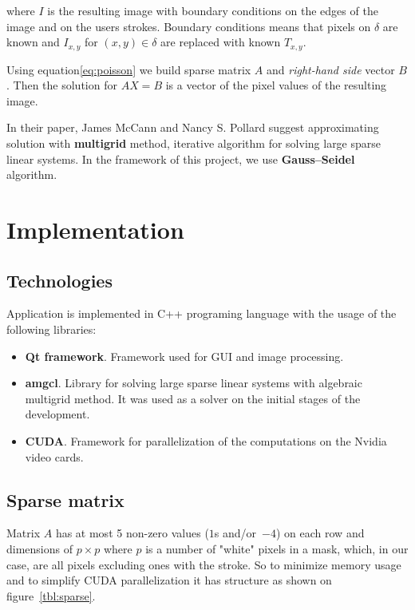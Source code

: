 \documentclass[hidelinks, english]{report}
\begin{document}
    where $I$ is the resulting image with boundary conditions on the edges of the image and on the users strokes. Boundary
    conditions means that pixels on $\delta$ are known and $I_{x,y}$ for $ (x,y) \in \delta$ are replaced with
    known $T_{x,y}$.

    Using equation\eqref{eq:poisson} we build sparse matrix $A$ and \textit{right-hand side} vector $B$. Then the solution
    for $AX=B$ is a vector of the pixel values of the resulting image.

    In their paper\cite{gradient}, James McCann and Nancy S. Pollard suggest approximating solution with \textbf{multigrid}
    method, iterative algorithm for solving large sparse linear systems. In the framework of this project, we use
    \textbf{Gauss–Seidel} algorithm.

    \section{Implementation}

    \subsection{Technologies}

    Application is implemented in C++ programing language with the usage of the following libraries:

    \begin{itemize}
        \item \textbf{Qt framework}. Framework used for GUI and image processing.
        \item \textbf{amgcl}. Library for solving large sparse linear systems with algebraic multigrid method. It was used
        as a solver on the initial stages of the development.
        \item \textbf{CUDA}. Framework for parallelization of the computations on the Nvidia video cards.
    \end{itemize}


    \subsection{Sparse matrix}

    Matrix $A$ has at most 5 non-zero values ($1$s and/or~$-4$) on each row and dimensions of $p \times p$ where $p$ is
    a number of "white" pixels in a mask, which, in our case, are all pixels excluding ones with the stroke. So to minimize
    memory usage and to simplify CUDA parallelization it has structure as shown on figure~\ref{tbl:sparse}.
\end{document}
